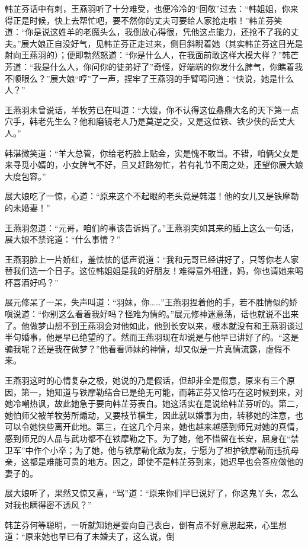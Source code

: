 \documentclass[12pt,oneside]{book}
\begin{document}
韩芷芬话中有刺，王燕羽听了十分难受，也便冷冷的``回敬''过去：``韩姐姐，你来得正是时候，快上去帮忙吧，要不然你的丈夫可要给人家抢走啦！''韩芷芬笑道：``你是说这姓羊的老魔头么，我倒放心得很，凭他这点能力，还抢不了我的丈夫。''展大娘正自没好气，见韩芷芬正走过来，侧目斜睨着她（其实韩芷芬这目光是射向王燕羽的）；便即勃然怒道：``你是什么人，在我面前敢这样大模大样？''韩芒芳道：``我是什么人，你问你的徒弟好了''奇怪，好端端的你发什么脾气，你瞧着我不顺眼么？''展大娘``哼''了一声，捏牢了王燕羽的手臂喝问道：``快说，她是什么人？''

王燕羽未曾说话，羊牧劳已在叫道：``大嫂，你不认得这位鼎鼎大名的天下第一点穴手，韩老先生么？他和磨镜老人乃是莫逆之交，又是这位铁、铁少侠的岳丈大人。''

韩湛微笑道：``羊大总管，你给老朽脸上贴金，实是愧不敢当。不错，咱俩父女是来寻觅小婿的，小女脾气不好，且又赶路匆忙，若有礼节不周之处，还望你展大娘大度包容。''

展大娘吃了一惊，心道：``原来这个不起眼的老头竟是韩湛！他的女儿又是铁摩勒的未婚妻！''

王燕羽忽道：``元哥，咱们的事该告诉妈了。''王燕羽突如其来的插上这么一句话，展大娘不禁诧道：``什么事情？''

王燕羽脸上一片娇红，羞怯怯的低声说道：``我和元哥已经讲好了，只等你老人家替我们选一个日子。这位韩姐姐是我的好朋友！难得意外相逢，妈，你也请她来喝杯喜酒好吗？''

展元修呆了一呆，失声叫道：``羽妹，你\ldots\ldots{}''王燕羽捏着他的手，若不胜情似的娇嗔说道：``你别这么看着我好吗？怪难为情的。''展元修神迷意荡，话也就说不出来了。他做梦山想不到王燕羽会对他如此，他到长安以来，根本就没有和王燕羽谈过半句婚事，他是早已绝望的了。然而王燕羽现在却说是与他早已讲好了的。``这是骗我呢？还是我在做梦？''他看看师妹的神情，却又似是一片真情流露，虚假不来。

王燕羽这时的心情复杂之极，她说的乃是假话，但却非全是假意，原来有三个原因，第一，她知道与铁摩勒结合已是绝无可能，而韩芷芬又恰巧在这时候到来，对她冷嘲热讽，故此她急于要向韩芷芬表白。她这活实在是说给韩芷芬听的。第二，她怕师父被羊牧劳所煽动，又要枝节横生，因此就以婚事为由，转移她的注意，也可以令她快些离开此地。第三，在这几个月来，她也越来越感到师兄对她的真情，感到师兄的人品与武功都不在铁摩勒之下。为了她，他不惜留在长安，屈身在``禁卫军''中作个小卒；为了她，他与铁摩勒化敌为友，宁愿为了袒护铁摩勒而违抗母亲，这都是难能可贵的地方。因之，即使不是韩芷芬到来，她迟早也会答应做他的妻子的。

展大娘听了，果然又惊又喜，``骂''道：``原来你们早巳说好了，你这鬼丫头，怎么对我也瞒得密不透风？''

韩芷芬何等聪明，一听就知她是要向自己表白，倒有点不好意思起来，心里想道：``原来她也早已有了未婚夫了，这么说，倒
\end{document}
